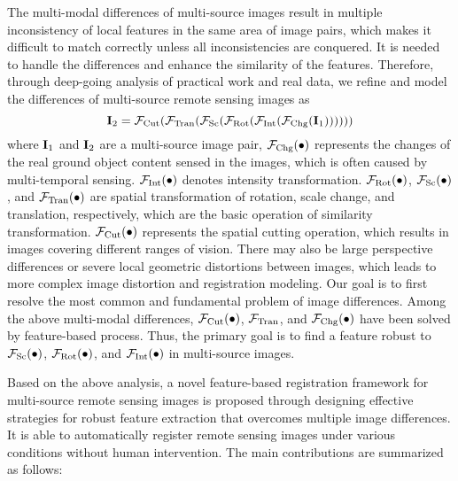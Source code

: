 The multi-modal differences of multi-source images result in multiple inconsistency of local features in the same area of image pairs, which makes it difficult to match correctly unless all inconsistencies are conquered. It is needed to handle the differences and enhance the similarity of the features. Therefore, through deep-going analysis of practical work and real data, we refine and model the differences of multi-source remote sensing images as
\begin{equation}
{{\bf{I}}_2} = {{\cal F}_{{\rm{Cut}}}}({{\cal F}_{{\rm{Tran}}}}({{\cal F}_{{\rm{Sc}}}}({{\cal F}_{{\rm{Rot}}}}({{\cal F}_{{\rm{Int}}}}({{\cal F}_{{\rm{Chg}}}}({{\bf{I}}_1}))))))
\end{equation}
where ${{\bf{I}}_1}$ and ${{\bf{I}}_2}$ are a multi-source image pair, ${{\cal F}_{{\rm{Chg}}}}( \bullet )$ represents the changes of the real ground object content sensed in the images, which is often caused by multi-temporal sensing.
${{\cal F}_{\rm{Int}}}( \bullet )$ denotes intensity transformation.
${{\cal F}_{{\rm{Rot}}}}( \bullet )$, ${{\cal F}_{{\rm{Sc}}}}( \bullet )$, and ${{\cal F}_{{\rm{Tran}}}}( \bullet )$ are spatial transformation of rotation, scale change, and translation, respectively, which are the basic operation of similarity transformation.
${{\cal F}_{{\rm{Cut}}}}( \bullet )$ represents the spatial cutting operation, which results in images covering different ranges of vision.
There may also be large perspective differences or severe local geometric distortions between images, which leads to more complex image distortion and registration modeling. Our goal is to first resolve the most common and fundamental problem of image differences. Among the above multi-modal differences, ${{\cal F}_{{\rm{Cut}}}}( \bullet )$, ${{\cal F}_{{\rm{Tran}}}}$, and ${{\cal F}_{{\rm{Chg}}}}( \bullet )$ have been solved by feature-based process. Thus, the primary goal is to find a feature robust to ${{\cal F}_{{\rm{Sc}}}}( \bullet )$, ${{\cal F}_{{\rm{Rot}}}}( \bullet )$, and ${{\cal F}_{\rm{Int}}}( \bullet )$ in multi-source images.

Based on the above analysis, a novel feature-based registration framework for multi-source remote sensing images is proposed through designing effective strategies for robust feature extraction that overcomes multiple image differences. It is able to automatically register remote sensing images under various conditions without human intervention. The main contributions are summarized as follows:

